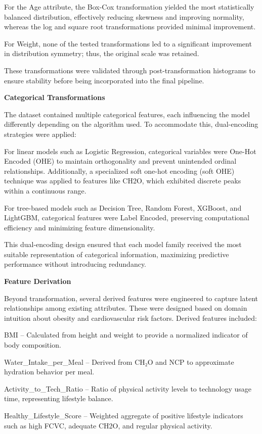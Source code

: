For the Age attribute, the Box-Cox transformation yielded the most statistically balanced distribution, effectively reducing skewness and improving normality, whereas the log and square root transformations provided minimal improvement.

For Weight, none of the tested transformations led to a significant improvement in distribution symmetry; thus, the original scale was retained.

These transformations were validated through post-transformation histograms to ensure stability before being incorporated into the final pipeline.

\textbf{Categorical Transformations}

The dataset contained multiple categorical features, each influencing the model differently depending on the algorithm used.
To accommodate this, dual-encoding strategies were applied:

For linear models such as Logistic Regression, categorical variables were One-Hot Encoded (OHE) to maintain orthogonality and prevent unintended ordinal relationships.
Additionally, a specialized soft one-hot encoding (soft OHE) technique was applied to features like CH2O, which exhibited discrete peaks within a continuous range.

For tree-based models such as Decision Tree, Random Forest, XGBoost, and LightGBM, categorical features were Label Encoded, preserving computational efficiency and minimizing feature dimensionality.

This dual-encoding design ensured that each model family received the most suitable representation of categorical information, maximizing predictive performance without introducing redundancy.

\textbf{Feature Derivation}

Beyond transformation, several derived features were engineered to capture latent relationships among existing attributes.
These were designed based on domain intuition about obesity and cardiovascular risk factors.
Derived features included:

BMI -- Calculated from height and weight to provide a normalized indicator of body composition.

Water\_Intake\_per\_Meal -- Derived from CH₂O and NCP to approximate hydration behavior per meal.

Activity\_to\_Tech\_Ratio -- Ratio of physical activity levels to technology usage time, representing lifestyle balance.

Healthy\_Lifestyle\_Score -- Weighted aggregate of positive lifestyle indicators such as high FCVC, adequate CH2O, and regular physical activity.

